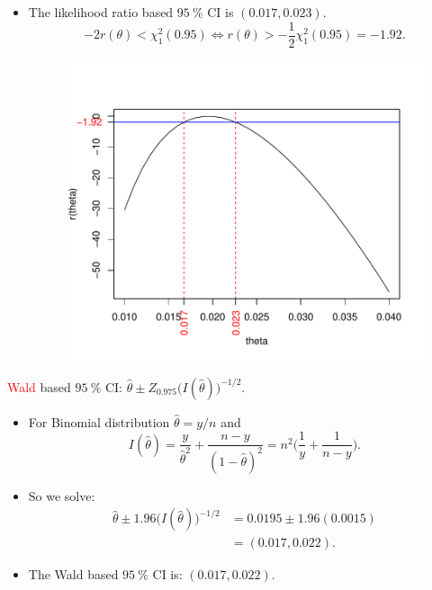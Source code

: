 \documentclass{article}\usepackage[]{graphicx}\usepackage[svgnames]{xcolor}
\newenvironment{knitrout}{}{} %
\begin{document}
\begin{itemize}
\begin{knitrout}
\end{knitrout}
      \item The likelihood ratio based $ \qty{95}{\percent} $ CI is $(0.017, 0.023)$.
            \[ -2r(\theta)<\chi^2_1(0.95)\iff r(\theta)>-\frac{1}{2} \chi^2_1(0.95)=-1.92. \]
            \begin{figure}[!htbp]
                  \centering
                  \includegraphics{figures/1bLR.pdf}
            \end{figure}
\end{itemize}
\textcolor{Red}{Wald} based $ \qty{95}{\percent} $ CI: $ \hat{\theta}\pm Z_{0.975}\bigl(I(\hat{\theta})\bigr)^{-1/2} $.
\begin{itemize}
      \item For Binomial distribution $ \hat{\theta}=y/n $ and
            \[ I(\hat{\theta})=\frac{y}{\hat{\theta}^2}+\frac{n-y}{(1-\hat{\theta})^2}=n^2\biggl(\frac{1}{y} +\frac{1}{n-y}\biggr).   \]
      \item So we solve:
            \begin{align*}
                  \hat{\theta}\pm 1.96\bigl(I(\hat{\theta})\bigr)^{-1/2}
                   & =0.0195 \pm 1.96(0.0015) \\
                   & =(0.017, 0.022).
            \end{align*}
      \item The Wald based $ \qty{95}{\percent} $ CI is: $ (0.017, 0.022) $.
\end{itemize}
\end{document}
